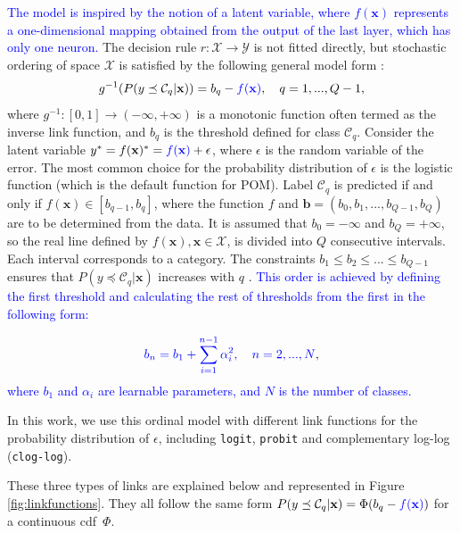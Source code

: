 \documentclass[journal]{IEEEtran}
\begin{document}
	\textcolor{blue}{The model is inspired by the notion of a latent variable, where $f(\textbf{x})$ represents a one-dimensional mapping obtained from the output of the last layer, which has only one neuron.} The decision rule $r: \mathcal{X} \rightarrow \mathcal{Y}$ is not fitted directly, but stochastic ordering of space $\mathcal{X}$ is satisfied by the following general model form \cite{herbrich2000large}:
	\begin{equation}
		g^{-1}(P(y \preceq \mathcal{C}_q | \mathbf{x})) = b_q - \textcolor{blue}{f(\mathbf{x})}, \quad q = 1, ..., Q-1,
	\end{equation}
	where $g^{-1} : [0,1] \rightarrow (-\infty, +\infty)$ is a monotonic function often termed as the inverse link function, and $b_q$ is the threshold defined for class $\mathcal{C}_q$. Consider the latent variable $y^* = f(\mathbf{x})^* = \textcolor{blue}{f(\mathbf{x})} + \epsilon$, where $\epsilon$ is the random variable of the error. The most common choice for the probability distribution of $\epsilon$ is the logistic function (which is the default function for POM). Label $\mathcal{C}_q$ is predicted if and only if $f(\mathbf{x}) \in [b_{q-1}, b_q]$, where the function $f$ and $\mathbf{b} = (b_0, b_1, ..., b_{Q-1}, b_Q)$ are to be determined from the data. It is assumed that $b_0 = -\infty$ and $b_Q = +\infty$, so the real line defined by $f(\textbf{x}), \textbf{x} \in \mathcal{X}$, is divided into $Q$ consecutive intervals. Each interval corresponds to a category. The constraints $b_1 \le b_2 \le ... \le b_{Q-1}$ ensures that $P(y \preceq \mathcal{C}_q | \mathbf{x})$ increases with $q$ \cite{mccullagh1980regression}.
	\textcolor{blue}{This order is achieved by defining the first threshold and calculating the rest of thresholds from the first in the following form:}
	
	\begin{equation}
	\textcolor{blue}{b_n = b_1 + \sum_{i=1}^{n-1} \alpha_i^2, \quad n = 2, ..., N},
	\end{equation}
	\textcolor{blue}{where $b_1$ and $\alpha_i$ are learnable parameters, and $N$ is the number of classes.}
	
	In this work, we use this ordinal model with different link functions for the probability distribution of $\epsilon$, including \texttt{logit}, \texttt{probit} and complementary log-log (\texttt{clog-log}).
	
	These three types of links are explained below and represented in Figure \ref{fig:linkfunctions}. They all follow the same form $P(y \preceq \mathcal{C}_q | \mathbf{x}) = \Phi(b_q - \textcolor{blue}{f(\mathbf{x})})$ for a continuous cdf~$\Phi$.
			
\end{document}

